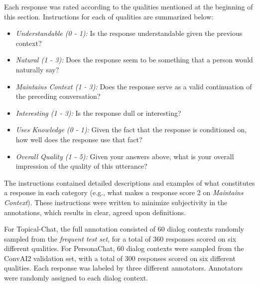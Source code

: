 \documentclass[11pt,a4paper]{article}
\begin{document}
Each response was rated according to the qualities mentioned at the beginning of this section. Instructions for each of qualities are summarized below:

\begin{itemize}
    \item \textit{Understandable (0 - 1):} Is the response understandable given the previous context?
    \item \textit{Natural (1 - 3):} Does the response seem to be something that a person would naturally say?
    \item \textit{Maintains Context (1 - 3):} Does the response serve as a valid continuation of the preceding conversation?
    \item \textit{Interesting (1 - 3):} Is the response dull or interesting?
    \item \textit{Uses Knowledge (0 - 1):} Given the fact that the response is conditioned on, how well does the response use that fact?
    \item \textit{Overall Quality (1 - 5):} Given your answers above, what is your overall impression of the quality of this utterance?
\end{itemize}

The instructions contained detailed descriptions and examples of what constitutes a response in each category (e.g., what makes a response score 2 on \textit{Maintains Context}). These instructions were written to minimize subjectivity in the annotations, which results in clear, agreed upon definitions. 

For Topical-Chat, the full annotation consisted of 60 dialog contexts randomly sampled from the \textit{frequent test set}, for a total of 360 responses scored on six different qualities. For PersonaChat, 60 dialog contexts were sampled from the ConvAI2 validation set, with a total of 300 responses scored on six different qualities. Each response was labeled by three different annotators. Annotators were randomly assigned to each dialog context.
\end{document}
